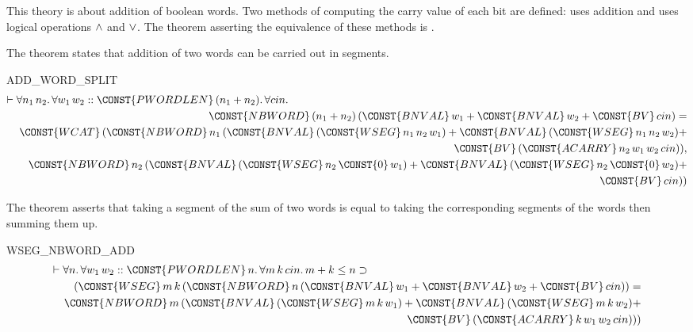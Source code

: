 This theory is about addition of boolean words. Two methods of
computing the carry value of each bit are defined:  uses
addition and  uses logical operations $\AND$ and $\OR$.
The theorem asserting the equivalence of these methods is
. 

The theorem  states that addition of two words
can be carried out in segments.
\begin{holthm}{ADD_WORD_SPLIT}
\begin{eqnarray*}
\lefteqn{\THM \FORALL n_{1} \,n_{2}\DOT
        \FORALL w_{1} \,w_{2}\RESDOT \CONST{PWORDLEN}
                                        \,(n_{1} + n_{2})\DOT
           \FORALL cin\DOT} \\
 & & \CONST{NBWORD} \,(n_{1} + n_{2})
                 \,(\CONST{BNVAL} \,w_{1} +
                    \CONST{BNVAL} \,w_{2} +
                    \CONST{BV} \,cin) = \\
 & & \CONST{WCAT} \,(\CONST{NBWORD} \,n_{1}
         \,(\CONST{BNVAL} \,(\CONST{WSEG} \,n_{1} \,n_{2} \,w_{1}) + 
           \CONST{BNVAL} \,(\CONST{WSEG} \,n_{1} \,n_{2} \,w_{2}) + \\
 & & \qquad \CONST{BV} \,(\CONST{ACARRY} \,n_{2} \,w_{1} \,w_{2} \,cin)),\\
 & & \quad \CONST{NBWORD} \,n_{2} 
         \,(\CONST{BNVAL} \,(\CONST{WSEG} \,n_{2} \,\CONST{0} \,w_{1}) +
            \CONST{BNVAL} \,(\CONST{WSEG} \,n_{2} \,\CONST{0} \,w_{2}) +\\
 & & \qquad \CONST{BV} \,cin))
\end{eqnarray*}
\end{holthm}
The theorem  asserts that taking a segment of
the sum of two words is equal to taking the corresponding segments of
the words then summing them up.
\begin{holthm}{WSEG_NBWORD_ADD}
\begin{eqnarray*}
\lefteqn{\THM \FORALL n\DOT
        \FORALL w_{1} \,w_{2}\RESDOT \CONST{PWORDLEN} \,n\DOT
           \FORALL m \,k \,cin\DOT
              m + k \LEE  n \IMP } \\
 & & (\CONST{WSEG} \,m \,k
      \,(\CONST{NBWORD} \,n \,
        (\CONST{BNVAL} \,w_{1} + \CONST{BNVAL} \,w_{2} + \CONST{BV} \,cin)) =\\
 & & \CONST{NBWORD} \,m \,(\CONST{BNVAL} \,(\CONST{WSEG} \,m \,k \,w_{1}) +
                           \CONST{BNVAL} \,(\CONST{WSEG} \,m \,k \,w_{2}) +\\
 & & \qquad \CONST{BV} \,(\CONST{ACARRY} \,k \,w_{1} \,w_{2} \,cin)))
\end{eqnarray*}
\end{holthm}


